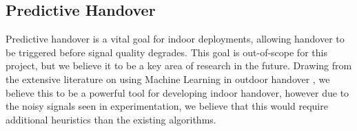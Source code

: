 \subsection{Predictive Handover}
Predictive handover is a vital goal for indoor deployments, allowing handover to be triggered before signal quality degrades. This goal is out-of-scope for this project, but we believe it to be a key area of research in the future. Drawing from the extensive literature on using Machine Learning in outdoor handover \insertref, we believe this to be a powerful tool for developing indoor handover, however due to the noisy signals seen in experimentation, we believe that this would require additional heuristics than the existing algorithms.
